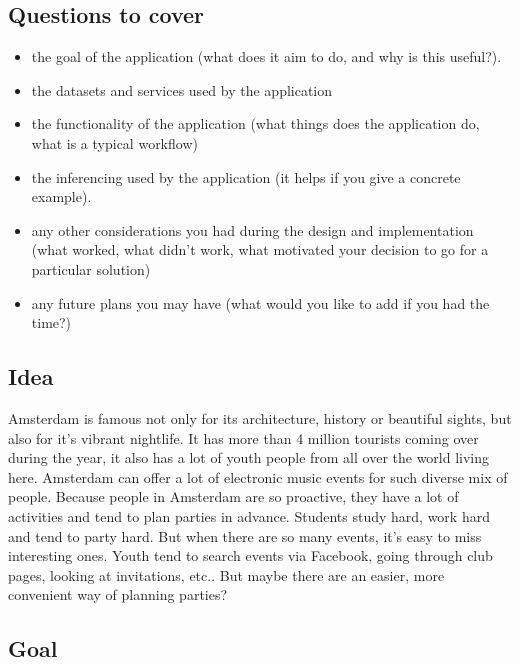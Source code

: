 \documentclass[12pt, a4paper, lithuanian]{article}
\begin{document}
\subsection{Questions to cover}

\begin{itemize}
  
    \item the goal of the application (what does it aim to do, and why is this useful?).

    \item the datasets and services used by the application

    \item the functionality of the application (what things does the application do, what is a typical workflow)

    \item the inferencing used by the application (it helps if you give a concrete example).

    \item any other considerations you had during the design and implementation (what worked, what didn't work, what motivated your decision to go for a particular solution)

    \item any future plans you may have (what would you like to add if you had the time?)

\end{itemize}

\subsection{Idea}

  Amsterdam is famous not only for its architecture, history or beautiful sights, but also for it's vibrant nightlife. It has more than 4 million tourists coming over during the year, it also has a lot of youth people from all over the world living here. Amsterdam can offer a lot of electronic music events for such diverse mix of people. 
  Because people in Amsterdam are so proactive, they have a lot of activities and tend to plan parties in advance. Students study hard, work hard and tend to party hard. But when there are so many events, it's easy to miss interesting ones. Youth tend to search events via Facebook, going through club pages, looking at invitations, etc.. But maybe there are an easier, more convenient way of planning parties? 

\subsection{Goal}
\end{document}
